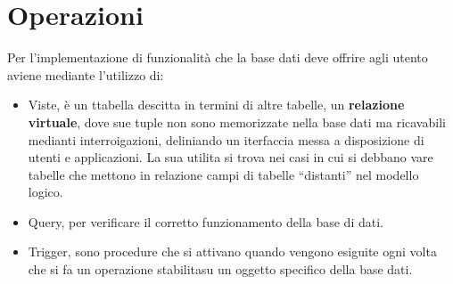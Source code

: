 \chapter{Operazioni}
Per l'implementazione di funzionalità che la base dati deve offrire agli utento aviene mediante l'utilizzo di:
\begin{itemize}
\item Viste, è un ttabella descitta in termini di altre tabelle, un \textbf{relazione virtuale}, dove sue tuple non sono memorizzate nella base dati ma ricavabili medianti interroigazioni, deliniando un iterfaccia messa a disposizione di utenti e applicazioni. La sua utilita si trova nei casi in cui si debbano vare tabelle che mettono in relazione campi di tabelle “distanti” nel modello logico.
\item Query, per verificare il corretto funzionamento della base di dati.
\item Trigger, sono procedure che si attivano quando vengono esiguite ogni volta che si fa un operazione stabilitasu un oggetto specifico della base dati.
\end{itemize}




